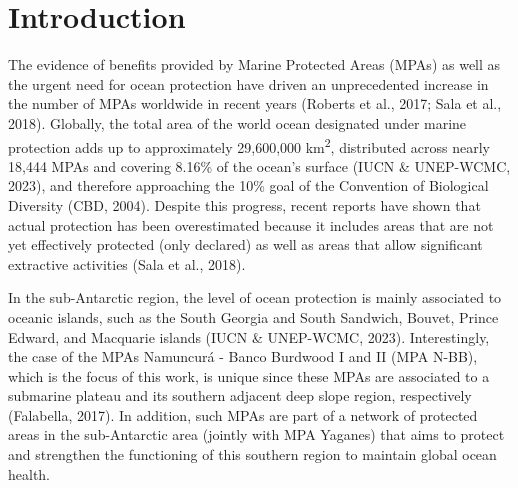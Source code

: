 \documentclass[preprint, 3p,
authoryear]{elsarticle} %
\begin{document}
\hypertarget{introduction}{%
\section{Introduction}\label{introduction}}

The evidence of benefits provided by Marine Protected Areas (MPAs) as
well as the urgent need for ocean protection have driven an
unprecedented increase in the number of MPAs worldwide in recent years
(Roberts et al., 2017; Sala et al., 2018). Globally, the total area of
the world ocean designated under marine protection adds up to
approximately 29,600,000 km\textsuperscript{2}, distributed across
nearly 18,444 MPAs and covering 8.16\% of the ocean's surface (IUCN \&
UNEP-WCMC, 2023), and therefore approaching the 10\% goal of the
Convention of Biological Diversity (CBD, 2004). Despite this progress,
recent reports have shown that actual protection has been overestimated
because it includes areas that are not yet effectively protected (only
declared) as well as areas that allow significant extractive activities
(Sala et al., 2018).

In the sub-Antarctic region, the level of ocean protection is mainly
associated to oceanic islands, such as the South Georgia and South
Sandwich, Bouvet, Prince Edward, and Macquarie islands (IUCN \&
UNEP-WCMC, 2023). Interestingly, the case of the MPAs Namuncurá - Banco
Burdwood I and II (MPA N-BB), which is the focus of this work, is unique
since these MPAs are associated to a submarine plateau and its southern
adjacent deep slope region, respectively (Falabella, 2017). In addition,
such MPAs are part of a network of protected areas in the sub-Antarctic
area (jointly with MPA Yaganes) that aims to protect and strengthen the
functioning of this southern region to maintain global ocean health.
\end{document}
